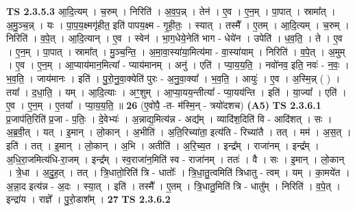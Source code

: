 \documentclass[17pt]{extarticle}
\begin{document}
                  \newline
                                \textbf{ TS 2.3.5.3} \newline
                  आ॒दि॒त्यम् । च॒रुम् । निरिति॑ । अ॒व॒प॒न्न् । तेन॑ । ए॒व । ए॒न॒म् । पा॒पात् । स्रामा᳚त् । अ॒मु॒ञ्च॒न्न् । यः । पा॒प॒य॒क्ष्मगृ॑हीत॒ इति॑ पापय॒क्ष्म - गृ॒ही॒तः॒ । स्यात् । तस्मै᳚ । ए॒तम् । आ॒दि॒त्यम् । च॒रुम् । निरिति॑ । व॒पे॒त् । आ॒दि॒त्यान् । ए॒व । स्वेन॑ । भा॒ग॒धेये॒नेति॑ भाग - धेये॑न । उपेति॑ । ध॒व॒ति॒ । ते । ए॒व । ए॒न॒म् । पा॒पात् । स्रामा᳚त् । मु॒ञ्च॒न्ति॒ । अ॒मा॒वा॒स्या॑या॒मित्य॑मा - वा॒स्या॑याम् । निरिति॑ । व॒पे॒त् । अ॒मुम् । ए॒व । ए॒न॒म् । आ॒प्याय॑मान॒मित्या᳚ - प्याय॑मानम् । अनु॑ । एति॑ । प्या॒य॒य॒ति॒ । नवो॑नव॒ इति॒ नवः॑ - न॒वः॒ । भ॒व॒ति॒ । जाय॑मानः । इति॑ । पु॒रो॒नु॒वा॒क्येति॑ पुरः - अ॒नु॒वा॒क्या᳚ । भ॒व॒ति॒ । आयुः॑ । ए॒व । अ॒स्मि॒न्न् ( ) । तया᳚ । द॒धा॒ति॒ । यम् । आ॒दि॒त्याः । अꣳ॒॒शुम् । आ॒प्या॒यय॒न्तीत्या᳚ - प्या॒यय॑न्ति । इति॑ । या॒ज्या᳚ । एति॑ । ए॒व । ए॒न॒म् ।  ए॒तया᳚ । प्या॒य॒य॒ति॒ ॥ \textbf{  26} \newline
                  \newline
                      (ए॒वोपै॒ -त- म॑स्मि॒न् - त्रयो॑दशच)  \textbf{(A5)} \newline \newline
                                \textbf{ TS 2.3.6.1} \newline
                  प्र॒जाप॑ति॒रिति॑ प्र॒जा - प॒तिः॒ । दे॒वेभ्यः॑ । अ॒न्नाद्य॒मित्य॑न्न - अद्य᳚म् । व्यादि॑श॒दिति॑ वि - आदि॑शत् । सः । अ॒ब्र॒वी॒त् । यत् । इ॒मान् । लो॒कान् । अ॒भीति॑ । अ॒ति॒रिच्या॑ता॒ इत्य॑ति - रिच्या॑तै । तत् । मम॑ । अ॒स॒त् । इति॑ । तत् । इ॒मान् । लो॒कान् । अ॒भि । अतीति॑ । अ॒रि॒च्य॒त । इन्द्र᳚म् । राजा॑नम् । इन्द्र᳚म् । अ॒धि॒रा॒जमित्य॑धि-रा॒जम् ।   इन्द्र᳚म् । स्व॒राजा॑न॒मिति॑ स्व - राजा॑नम् । ततः॑ । वै । सः । इ॒मान् । लो॒कान् । त्रे॒धा । अ॒दु॒ह॒त् । तत् । त्रि॒धातो॒रिति॑ त्रि - धातोः᳚ । त्रि॒धा॒तु॒त्वमिति॑ त्रिधातु - त्वम् । यम् । का॒मये॑त । अ॒न्ना॒द इत्य॑न्न - अ॒दः । स्या॒त् । इति॑ । तस्मै᳚ । ए॒तम् । त्रि॒धातु॒मिति॑ त्रि - धातु᳚म् । निरिति॑ । व॒पे॒त् । इन्द्रा॑य । राज्ञे᳚ । पु॒रो॒डाश᳚म् । \textbf{  27} \newline
                  \newline
                                \textbf{ TS 2.3.6.2} \newline
\end{document}
